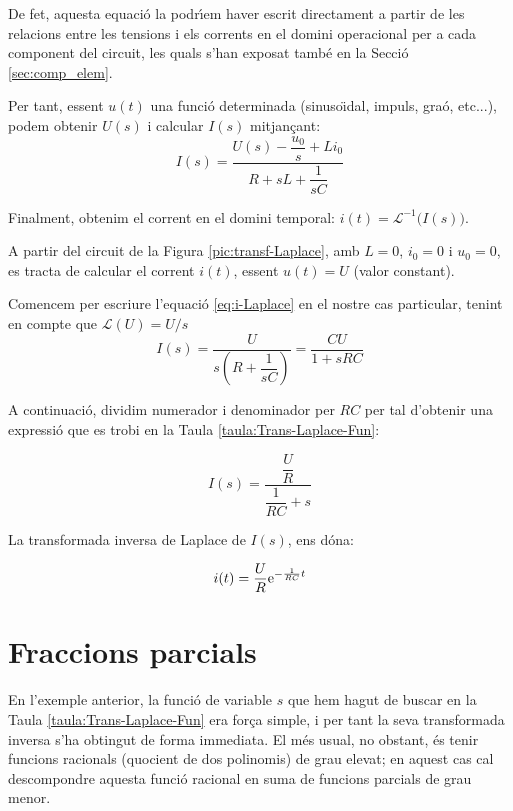 De fet, aquesta equaci\'{o} la podr\'{\i}em haver escrit directament a
partir de les relacions entre les tensions i els corrents en el
domini operacional per a cada  component del circuit, les quals
s'han exposat tamb\'{e} en la Secci\'{o} \vref{sec:comp_elem}.

Per tant, essent $u(t)$  una funci\'{o} determinada (sinuso\"{\i}dal, impuls,
gra\'{o}, etc...), podem obtenir $U(s)$ i calcular $I(s)$ mitjan\c{c}ant:
\begin{equation}
    I(s) = \frac{U(s)-\dfrac{u_0}{s} + L i_0}{R + s L
    +\dfrac{1}{s C}}\label{eq:i-Laplace}
\end{equation}

Finalment, obtenim el corrent en el domini temporal: $i(t) =
\mathcal{L}^{-1}\bigl(I(s)\bigr)$.

\begin{exemple}
    A partir del circuit de la Figura \vref{pic:transf-Laplace}, amb
    $L=0$, $i_0=0$ i $u_0=0$, es tracta de calcular el corrent $i(t)$,
    essent $u(t)=U$ (valor constant).

    Comencem per escriure l'equaci\'{o} \eqref{eq:i-Laplace} en el nostre
    cas particular, tenint en compte que $\mathcal{L}(U) = U/s$
    \[
        I(s) = \frac{U}{s\left(R + \dfrac{1}{s C}\right)} = \frac{C U}{1 + s R C}
    \]

    A continuaci\'{o}, dividim numerador i denominador per $R C$ per tal
    d'obtenir una expressi\'{o} que es trobi en la Taula
    \vref{taula:Trans-Laplace-Fun}:

    \[
        I(s) = \frac{\dfrac{U}{R}}{\dfrac{1}{R C} + s}
    \]

    La transformada inversa de Laplace de $I(s)$, ens d\'{o}na:

    \[
        i(t) = \frac{U}{R} \mathrm{e}^{-\frac{1}{R C}t}
    \]
\end{exemple}

\section{Fraccions parcials}

En l'exemple anterior, la funci\'{o} de variable $s$ que hem hagut de
buscar en la Taula \vref{taula:Trans-Laplace-Fun} era for\c{c}a simple, i
per tant la seva transformada inversa s'ha obtingut de forma
immediata. El m\'{e}s usual, no obstant, \'{e}s tenir funcions racionals
(quocient de dos polinomis) de grau elevat; en aquest cas cal
descompondre aquesta funci\'{o} racional en suma de funcions parcials de
grau menor.

